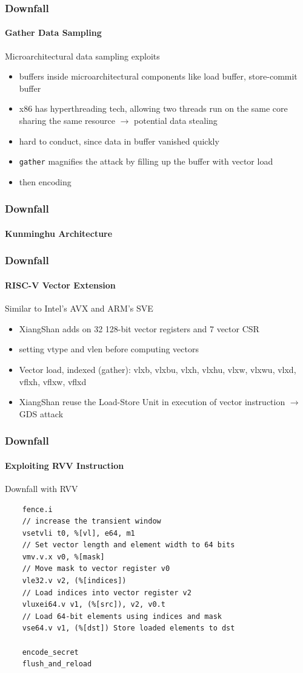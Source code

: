 \documentclass{beamer}
\begin{document}
\begin{frame}
    \frametitle{Downfall}
    \framesubtitle{Gather Data Sampling}
    Microarchitectural data sampling exploits
    \begin{itemize}[<+->]
        \item buffers inside microarchitectural components like load buffer, store-commit buffer
        \item x86 has hyperthreading tech, allowing two threads run on the same core sharing the same resource $\rightarrow$ potential data stealing
        \item hard to conduct, since data in buffer vanished quickly
        \item \texttt{gather} magnifies the attack by filling up the buffer with vector load
        \item then encoding
    \end{itemize}
\end{frame}

\begin{frame}
    \frametitle{Downfall}
    \framesubtitle{Kunminghu Architecture}
    \begin{center}
        
    \end{center}
\end{frame}

\begin{frame}
    \frametitle{Downfall}
    \framesubtitle{RISC-V Vector Extension}
    Similar to Intel's AVX and ARM's SVE
    \begin{itemize}[<+->]
        \item XiangShan adds on 32 128-bit vector registers and 7 vector CSR
        \item setting vtype and vlen before computing vectors
        \item Vector load, indexed (gather): vlxb, vlxbu, vlxh, vlxhu, vlxw, vlxwu, vlxd, vflxh, vflxw, vflxd
        \item XiangShan reuse the Load-Store Unit in execution of vector instruction $\rightarrow$ GDS attack
    \end{itemize}
\end{frame}

\begin{frame}[fragile]
    \frametitle{Downfall}
    \framesubtitle{Exploiting RVV Instruction}
    Downfall with RVV
    \begin{lstlisting}
    fence.i
    // increase the transient window
    vsetvli t0, %[vl], e64, m1 
    // Set vector length and element width to 64 bits
    vmv.v.x v0, %[mask]
    // Move mask to vector register v0
    vle32.v v2, (%[indices])
    // Load indices into vector register v2
    vluxei64.v v1, (%[src]), v2, v0.t
    // Load 64-bit elements using indices and mask
    vse64.v v1, (%[dst]) Store loaded elements to dst

    encode_secret
    flush_and_reload
    \end{lstlisting}
\end{frame}
\end{document}
